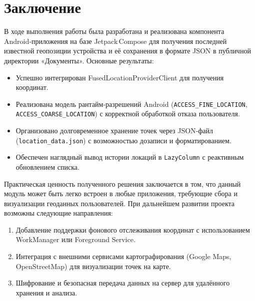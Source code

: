 \chapter*{Заключение}

В ходе выполнения работы была разработана и реализована компонента Android‑приложения на базе Jetpack Compose для получения последней известной геопозиции устройства и её сохранения в формате JSON в публичной директории «Документы». Основные результаты:
\begin{itemize}
    \item Успешно интегрирован FusedLocationProviderClient для получения координат.
    \item Реализована модель рантайм‑разрешений Android (\texttt{ACCESS\_FINE\_LOCATION}, \texttt{ACCESS\_COARSE\_LOCATION}) с корректной обработкой отказа пользователя.
    \item Организовано долговременное хранение точек через JSON‑файл (\texttt{location\_data.json}) с возможностью дозаписи и форматированием.
    \item Обеспечен наглядный вывод истории локаций в \texttt{LazyColumn} с реактивным обновлением списка.
\end{itemize}

Практическая ценность полученного решения заключается в том, что данный модуль может быть легко встроен в любые приложения, требующие сбора и визуализации геоданных пользователей. При дальнейшем развитии проекта возможны следующие направления:
\begin{enumerate}
    \item Добавление поддержки фонового отслеживания координат с использованием WorkManager или Foreground Service.
    \item Интеграция с внешними сервисами картографирования (Google Maps, OpenStreetMap) для визуализации точек на карте.
    \item Шифрование и безопасная передача данных на сервер для удалённого хранения и анализа.
\end{enumerate}
